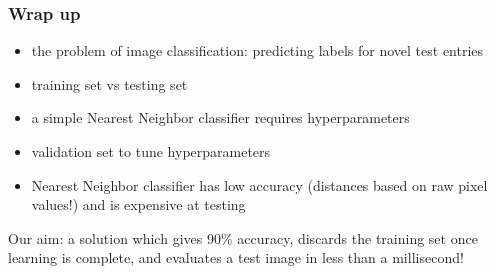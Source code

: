 \begin{frame}
	\frametitle{Wrap up}
	
	\begin{itemize}
		\item the problem of image classification: predicting labels for novel test entries
		\item training set vs testing set
		\item a simple Nearest Neighbor classifier requires hyperparameters
		\item validation set to tune hyperparameters
		\item Nearest Neighbor classifier has low accuracy (distances based on raw pixel values!) and is expensive at testing
	\end{itemize}

	Our aim: a solution which gives 90\% accuracy, discards the training set once learning is complete, and evaluates a test image in less than a millisecond!

\end{frame}






